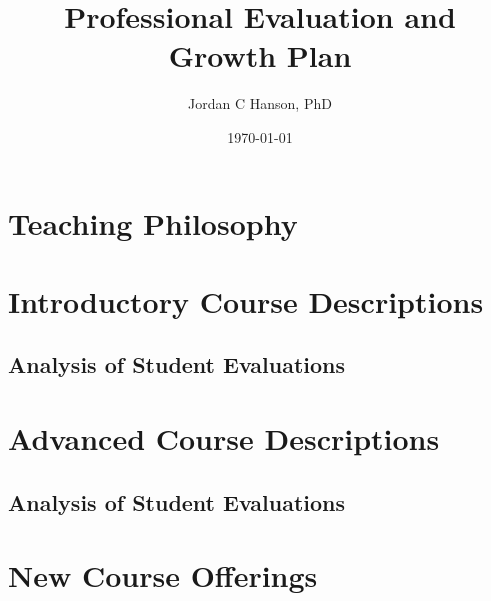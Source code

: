 \documentclass[10pt,oneside]{book}
\title{Professional Evaluation and Growth Plan}
\author{Jordan C Hanson, PhD}
\date{\today}
\begin{document}
\maketitle
\tableofcontents

\clearpage

\section{Teaching Philosophy}

\begin{flushleft}

\end{flushleft}

\clearpage

\section{Introductory Course Descriptions}

\begin{flushleft}

\end{flushleft}

\clearpage

\subsection{Analysis of Student Evaluations}

\begin{flushleft}

\end{flushleft}

\clearpage

\section{Advanced Course Descriptions}

\begin{flushleft}

\end{flushleft}

\subsection{Analysis of Student Evaluations}

\begin{flushleft}

\end{flushleft}

\section{New Course Offerings}

\begin{flushleft}

\end{flushleft}



\end{document}
